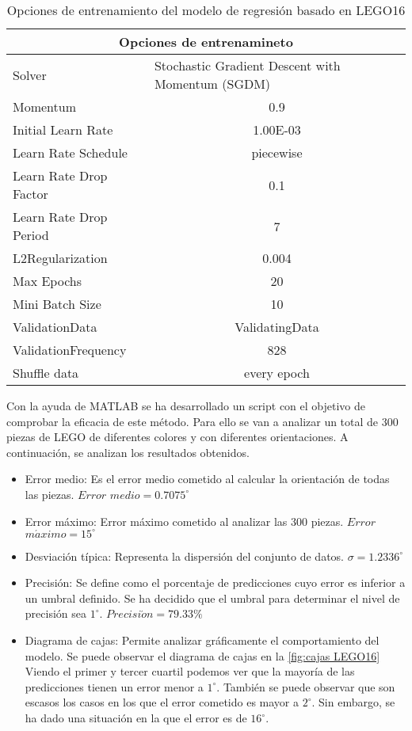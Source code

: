 \begin{table}[htbp]
  \centering
    \begin{tabular}{|l|c|}
    \hline
    \multicolumn{2}{|c|}{Opciones de entrenamineto} \\
    \hline
    Solver & \multicolumn{1}{l|}{Stochastic Gradient Descent with Momentum (SGDM)} \\
    \hline
    Momentum & 0.9 \\
    \hline
    Initial Learn Rate & 1.00E-03 \\
    \hline
    Learn Rate Schedule & piecewise \\
    \hline
    Learn Rate Drop Factor & 0.1 \\
    \hline
    Learn Rate Drop Period & 7 \\
    \hline
    L2Regularization & 0.004 \\
    \hline
    Max Epochs & 20 \\
    \hline
    Mini Batch Size & 10 \\
    \hline
    ValidationData & ValidatingData \\
    \hline
    ValidationFrequency & 828 \\
    \hline
    Shuffle data & every epoch \\
    \hline
    \end{tabular}%
  \caption{Opciones de entrenamiento del modelo de regresión basado en LEGO16}
  \label{tab:regresion LEGO16 options}%
\end{table}%

Con la ayuda de MATLAB se ha desarrollado un script con el objetivo de comprobar la eficacia de este método. Para ello se van a analizar un total de 300 piezas de LEGO de diferentes colores y con diferentes orientaciones. A continuación, se analizan los resultados obtenidos.

\begin{itemize}
\item Error medio: Es el error medio cometido al calcular la orientación de todas las piezas. $Error$ $medio = 0.7075^{\circ}$
\item Error máximo: Error máximo cometido al analizar las 300 piezas. $Error$ $m \acute{a} ximo = 15^{\circ}$
\item Desviación típica: Representa la dispersión del conjunto de datos. $\sigma = 1.2336^{\circ}$
\item Precisión: Se define como el porcentaje de predicciones cuyo error es inferior a un umbral definido. Se ha decidido que el umbral para determinar el nivel de precisión sea $1^{\circ}$. $Precisi \acute{o} n = 79.33\%$
\item Diagrama de cajas: Permite analizar gráficamente el comportamiento del modelo. Se puede observar el diagrama de cajas en la \autoref{fig:cajas LEGO16} Viendo el primer y tercer cuartil podemos ver que la mayoría de las predicciones tienen un error menor a $1^{\circ}$. También se puede observar que son escasos los casos en los que el error cometido es mayor a $2^{\circ}$. Sin embargo, se ha dado una situación en la que el error es de $16^{\circ}$.
\end{itemize}

